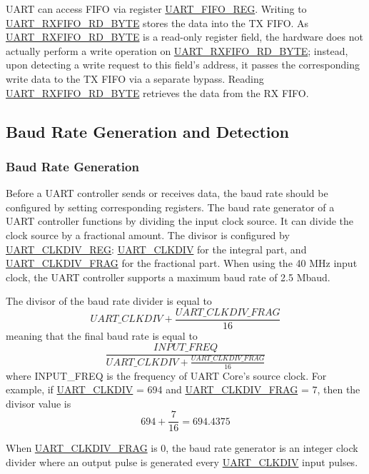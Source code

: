 \documentclass[main\_\_EN.tex]{subfiles}
\begin{document}
UART can access FIFO via register \hyperref[regdesc:UARTFIFOREG]{UART\_FIFO\_REG}. Writing to \hyperref[fielddesc:UARTRXFIFORDBYTE]{UART\_RXFIFO\_RD\_BYTE} stores the data into the TX FIFO. As \hyperref[fielddesc:UARTRXFIFORDBYTE]{UART\_RXFIFO\_RD\_BYTE} is a read-only register field, the hardware does not actually perform a write operation on \hyperref[fielddesc:UARTRXFIFORDBYTE]{UART\_RXFIFO\_RD\_BYTE}; instead, upon detecting a write request to this field's address, it passes the corresponding write data to the TX FIFO via a separate bypass. Reading \hyperref[fielddesc:UARTRXFIFORDBYTE]{UART\_RXFIFO\_RD\_BYTE} retrieves the data from the RX FIFO.


\subsection{Baud Rate Generation and Detection}

\subsubsection{Baud Rate Generation}

Before a UART controller sends or receives data, the baud rate should be configured by setting corresponding registers. The baud rate generator of a UART controller functions by dividing the input clock source. It can divide the clock source by a fractional amount. The divisor is configured by \hyperref[regdesc:UARTCLKDIVREG]{UART\_CLKDIV\_REG}: \hyperref[fielddesc:UARTCLKDIV]{UART\_CLKDIV} for the integral part, and \hyperref[fielddesc:UARTCLKDIVFRAG]{UART\_CLKDIV\_FRAG} for the fractional part. When using the 40 MHz input clock, the UART controller supports a maximum baud rate of 2.5 Mbaud.

The divisor of the baud rate divider is equal to
\[
    \hyperref[fielddesc:UARTCLKDIV]{UART\_CLKDIV} + \frac{\hyperref[fielddesc:UARTCLKDIVFRAG]{UART\_CLKDIV\_FRAG}}{16}
\]
meaning that the final baud rate is equal to
\[
    \frac{INPUT\_FREQ}{\hyperref[fielddesc:UARTCLKDIV]{UART\_CLKDIV} + \frac{\hyperref[fielddesc:UARTCLKDIVFRAG]{UART\_CLKDIV\_FRAG}}{16}}
\]
where INPUT\_FREQ is the frequency of UART Core's source clock. For example, if \hyperref[fielddesc:UARTCLKDIV]{UART\_CLKDIV} = 694 and \hyperref[fielddesc:UARTCLKDIVFRAG]{UART\_CLKDIV\_FRAG} = 7,
then the divisor value is
\[
    694 + \frac{7}{16} = 694.4375
\]


When \hyperref[fielddesc:UARTCLKDIVFRAG]{UART\_CLKDIV\_FRAG} is 0, the baud rate generator is an integer clock divider where an output pulse is generated every
\hyperref[fielddesc:UARTCLKDIV]{UART\_CLKDIV} input pulses.
\end{document}
